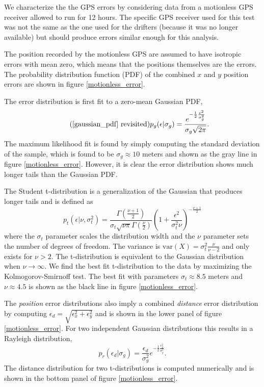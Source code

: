 \documentclass[10pt,journal]{IEEEtran}
\begin{document}
We characterize the the GPS errors by considering data from a motionless GPS receiver allowed to run for 12 hours. The specific GPS receiver used for this test was not the same as the one used for the drifters (because it was no longer available) but should produce errors similar enough for this analysis.

The position recorded by the motionless GPS are assumed to have isotropic errors with mean zero, which means that the positions themselves are the errors. The probability distribution function (PDF) of the combined $x$ and $y$ position errors are shown in figure \ref{motionless_error}.

The error distribution is first fit to a zero-mean Gaussian PDF,
\begin{equation}
\tag{\ref{gaussian_pdf} revisited}
p_g(\epsilon|\sigma_g) = \frac{e^{-\frac{1}{2}\frac{\epsilon^2}{\sigma_g^2}} }{\sigma_g \sqrt{ 2 \pi}}.
\end{equation}
The maximum likelihood fit is found by simply computing the standard deviation of the sample, which is found to be $\sigma_g \approx 10$ meters and shown as the gray line in figure \ref{motionless_error}. However, it is clear the error distribution shows much longer tails than the Gaussian PDF.

The Student t-distribution is a generalization of the Gaussian that produces longer tails and is defined as 
\begin{equation}
\label{student_pdf}
p_t\left(\epsilon |\nu,\sigma_t^2\right) = \frac{\Gamma\left( \frac{\nu + 1}{2} \right)}{\sigma_t \sqrt{\nu \pi} \Gamma\left(\frac{\nu}{2}\right)} \left( 1 + \frac{\epsilon^2}{\sigma_t^2 \nu} \right)^{-\frac{\nu+1}{2}}
\end{equation}
where the $\sigma_t$ parameter scales the distribution width and the $\nu$ parameter sets the number of degrees of freedom. The variance is $\textrm{var}(X)=\sigma_t^2 \frac{\nu}{\nu-2}$ and only exists for $\nu > 2$. The t-distribution is equivalent to the Gaussian distribution when $\nu \rightarrow \infty$. We find the best fit t-distribution to the data by maximizing the Kolmogorov-Smirnoff test. The best fit with parameters $\sigma_t \approx 8.5$ meters and $\nu \approx 4.5$ is shown as the black line in figure \ref{motionless_error}.

The \emph{position} error distributions also imply a combined \emph{distance} error distribution by computing $\epsilon_d = \sqrt{\epsilon_x^2 + \epsilon_y^2}$ and is shown in the lower panel of figure \ref{motionless_error}. For two independent Gaussian distributions this results in a Rayleigh distribution,
\begin{equation}
\label{rayleigh_pdf}
p_r(\epsilon_d|\sigma_g) = \frac{\epsilon_d}{\sigma_g^2 } e^{-\frac{1}{2}\frac{\epsilon_d^2}{\sigma_g^2}}.
\end{equation}
The distance distribution for two t-distributions is computed numerically and is shown in the bottom panel of figure \ref{motionless_error}.
\end{document}
